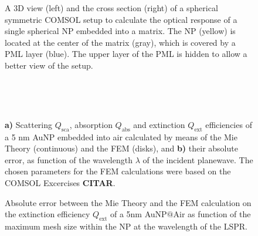
%
\begin{figure}[h!]\centering
	\def\svgwidth{.8\textwidth} \small
{}
\vspace*{0em}
\caption[Spherical symmetric COMSOL Setup]{A 3D view (left) and the cross section (right) of a spherical symmetric COMSOL setup to calculate the optical response of a single spherical NP embedded into a matrix. The NP (yellow) is located at the center of the matrix (gray), which is covered by a PML layer (blue). The upper layer of the PML is hidden to allow a better view of the setup.}
\label{fig:setup:sphere}
\end{figure}


%
\begin{figure}[h!]
\def\svgwidth{\textwidth} \small
\hspace*{.75em}
\begin{subfigure}{.1\textwidth}\caption{ }\label{fig:Eff:sphere:First:a}\end{subfigure}
\vspace*{12.5em} %
\\
\vspace*{-16.5em} %
\hspace*{0.5em}%
\begin{subfigure}{.1\textwidth}\caption{ }\label{fig:Eff:sphere:First:b}\end{subfigure}\\
\vspace*{-1.5em} %
\caption[Scattering, Absorption and Extinction Efficiencies of a 5 nm AuNP$@$Air: Analytical and FEM solutions with no optimizatio]{\textbf{a)} Scattering $Q_\text{sca}$, absorption $Q_\text{abs}$ and extinction $Q_\text{ext}$ efficiencies of a 5 nm AuNP embedded into air calculated by means of the Mie Theory (continuous) and the FEM (disks), and \textbf{b)} their absolute error, as function of the wavelength $\lambda$ of the incident planewave. The chosen parameters for the FEM calculations were based on the COMSOL Excercises \textbf{CITAR}.}
\label{fig:Eff:sphere:First}
\end{figure}


%
\begin{figure}[h!]\centering
	\def\svgwidth{.8\textwidth} \small
{}
\vspace*{-1em}
\caption[Extinction Efficiency Absolute Error: NP Max Mesh Size Analysis]{Absolute error between the Mie Theory and the FEM calculation on the extinction efficiency $Q_\text{ext}$ of a 5nm AuNP$@$Air as function of the maximum mesh size within the NP at the wavelength of the LSPR.}
\label{fig:Eff:sphere:radius}
\end{figure}

